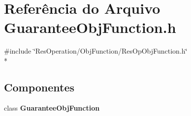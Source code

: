 \section{Referência do Arquivo Guarantee\+Obj\+Function.\+h}
\label{_obj_function_2_guarantee_2_guarantee_obj_function_8h}
{\ttfamily \#include \char`\"{}Res\+Operation/\+Obj\+Function/\+Res\+Op\+Obj\+Function.\+h\char`\"{}}\\*
\subsection*{Componentes}
\begin{DoxyCompactItemize}
\item 
class {\bf Guarantee\+Obj\+Function}
\end{DoxyCompactItemize}
